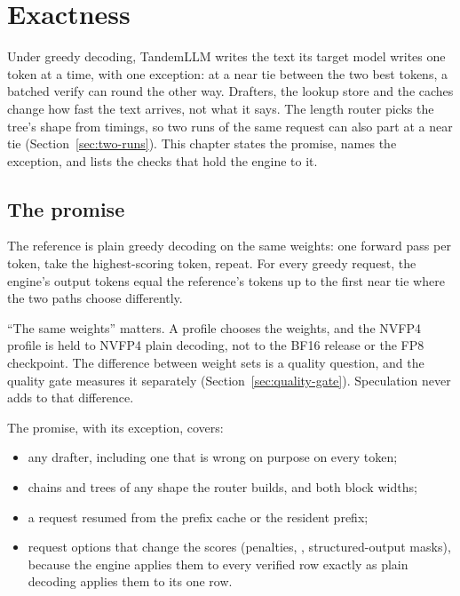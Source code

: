\chapter{Exactness}\label{ch:exactness}

Under greedy decoding, TandemLLM writes the text its target model writes one token at a time, with one exception: at a near tie between the two best tokens, a batched verify can round the other way. Drafters, the lookup store and the caches change how fast the text arrives, not what it says. The length router picks the tree's shape from timings, so two runs of the same request can also part at a near tie (Section~\ref{sec:two-runs}). This chapter states the promise, names the exception, and lists the checks that hold the engine to it.

\section{The promise}

The reference is plain greedy decoding on the same weights: one forward pass per token, take the highest-scoring token, repeat. For every greedy request, the engine's output tokens equal the reference's tokens up to the first near tie where the two paths choose differently.

\enquote{The same weights} matters. A profile chooses the weights, and the NVFP4 profile is held to NVFP4 plain decoding, not to the BF16 release or the FP8 checkpoint. The difference between weight sets is a quality question, and the quality gate measures it separately (Section~\ref{sec:quality-gate}). Speculation never adds to that difference.

The promise, with its exception, covers:

\begin{itemize}
\item any drafter, including one that is wrong on purpose on every token;
\item chains and trees of any shape the router builds, and both block widths;
\item a request resumed from the prefix cache or the resident prefix;
\item request options that change the scores (penalties, , structured-output masks), because the engine applies them to every verified row exactly as plain decoding applies them to its one row.
\end{itemize}

